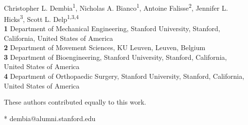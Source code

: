 \documentclass[10pt,letterpaper]{article}
\providecommand{\DIFaddtex}[1]{{\protect\color{blue}\uwave{#1}}} %
\providecommand{\DIFaddbegin}{} %
\providecommand{\DIFaddend}{} %
\providecommand{\DIFadd}[1]{\texorpdfstring{\DIFaddtex{#1}}{#1}} %
\newcommand{\DIFaddincludegraphics}[2][]{{\color{blue}\fbox{\DIFOincludegraphics[#1]{#2}}}} %
\DeclareRobustCommand{\DIFaddbegin}{\DIFOaddbegin \let\includegraphics\DIFaddincludegraphics} %
\DeclareRobustCommand{\DIFaddend}{\DIFOaddend \let\includegraphics\DIFOincludegraphics} %
\begin{document}
\vspace*{0.2in}

\begin{flushleft}
{\Large
\textbf{} %
}
\newline
\\
Christopher L. Dembia\textsuperscript{1\Yinyang*},
Nicholas A. Bianco\textsuperscript{1\Yinyang},
Antoine Falisse\textsuperscript{2\DIFaddbegin \DIFadd{,3}\DIFaddend },
Jennifer L. Hicks\textsuperscript{3},
Scott L. Delp\textsuperscript{1,3,4}
\\
\bigskip
\textbf{1} Department of Mechanical Engineering, Stanford University, Stanford, California, United States of America
\\
\textbf{2} Department of Movement Sciences, KU Leuven, Leuven, Belgium
\\
\textbf{3} Department of Bioengineering, Stanford University, Stanford, California, United States of America
\\
\textbf{4} Department of Orthopaedic Surgery, Stanford University, Stanford, California, United States of America
\\
\bigskip

%
%
\Yinyang These authors contributed equally to this work.





* dembia@alumni.stanford.edu

\end{flushleft}
\end{document}
